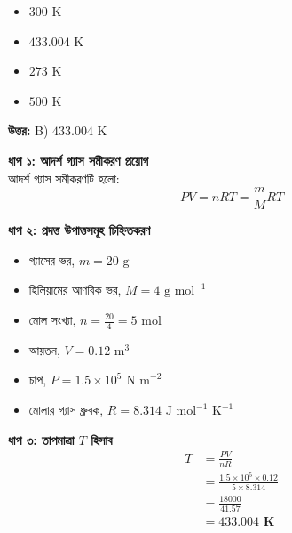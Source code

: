 \documentclass[12pt, a4paper]{article}
\begin{document}
\begin{itemize}[label={}, leftmargin=1cm, itemsep=0.5em]
    \item[\textbf{A)}] $300\text{ K}$
    \item[\textbf{B)}] $433.004\text{ K}$
    \item[\textbf{C)}] $273\text{ K}$
    \item[\textbf{D)}] $500\text{ K}$
\end{itemize}

\vspace{0.5em}
\begin{tcolorbox}[answerbox]
    \textbf{\color{success} উত্তর:} B) $433.004\text{ K}$
\end{tcolorbox}
\vspace{1em}

\begin{tcolorbox}[solutionbox={সমাধান (Solution)}]
    \noindent
    \textbf{ধাপ ১: আদর্শ গ্যাস সমীকরণ প্রয়োগ} \\
    আদর্শ গ্যাস সমীকরণটি হলো:
    \[ PV = nRT = \frac{m}{M} R T \]
    
    \vspace{0.4em}
    \noindent\textbf{ধাপ ২: প্রদত্ত উপাত্তসমূহ চিহ্নিতকরণ}
    \begin{itemize}[leftmargin=1.5em, itemsep=0.2em]
        \item গ্যাসের ভর, $m = 20\text{ g}$
        \item হিলিয়ামের আণবিক ভর, $M = 4\text{ g mol}^{-1}$
        \item মোল সংখ্যা, $n = \frac{20}{4} = 5\text{ mol}$
        \item আয়তন, $V = 0.12\text{ m}^3$
        \item চাপ, $P = 1.5 \times 10^5\text{ N m}^{-2}$
        \item মোলার গ্যাস ধ্রুবক, $R = 8.314\text{ J mol}^{-1}\text{ K}^{-1}$
    \end{itemize}
    
    \vspace{0.4em}
    \noindent\textbf{ধাপ ৩: তাপমাত্রা $T$ হিসাব}
    \begin{align*}
        T &= \frac{P V}{n R} \\
        &= \frac{1.5 \times 10^5 \times 0.12}{5 \times 8.314} \\
        &= \frac{18000}{41.57} \\
        &= \mathbf{433.004\text{ K}}
    \end{align*}
\end{tcolorbox}
\end{document}

